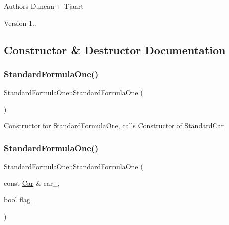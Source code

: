 \begin{DoxyAuthor}{Authors}
Duncan + Tjaart 
\end{DoxyAuthor}
\begin{DoxyVersion}{Version}
1.. 
\end{DoxyVersion}


\subsection{Constructor \& Destructor Documentation}
\mbox{\label{class_standard_formula_one_ac72e5d9c1c5a17f68df5e423d59b6490}} 
\subsubsection{\texorpdfstring{Standard\+Formula\+One()}{StandardFormulaOne()}\hspace{0.1cm}{\footnotesize\ttfamily [1/2]}}
{\footnotesize\ttfamily Standard\+Formula\+One\+::\+Standard\+Formula\+One (\begin{DoxyParamCaption}{ }\end{DoxyParamCaption})\hspace{0.3cm}{\ttfamily [inline]}}

Constructor for \mbox{\hyperlink{class_standard_formula_one}{Standard\+Formula\+One}}, calls Constructor of \mbox{\hyperlink{class_standard_car}{Standard\+Car}} \mbox{\label{class_standard_formula_one_a49e6ebbbfb70b6fcf039de1dd57b4915}} 
\subsubsection{\texorpdfstring{Standard\+Formula\+One()}{StandardFormulaOne()}\hspace{0.1cm}{\footnotesize\ttfamily [2/2]}}
{\footnotesize\ttfamily Standard\+Formula\+One\+::\+Standard\+Formula\+One (\begin{DoxyParamCaption}\item[{const \mbox{\hyperlink{class_car}{Car}} \&}]{car\+\_\+,  }\item[{bool}]{flag\+\_\+ }\end{DoxyParamCaption})\hspace{0.3cm}{\ttfamily [inline]}}


